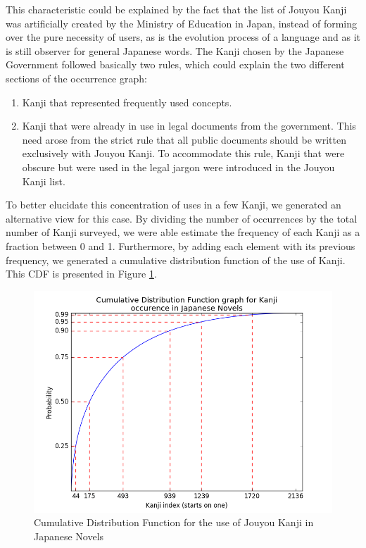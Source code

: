 This characteristic could be explained by the fact that the list of Jouyou Kanji was artificially created by the Ministry of Education in Japan, instead of forming over the pure necessity of users, as is the evolution process of a language and as it is still observer for general Japanese words. The Kanji chosen by the Japanese Government followed basically two rules, which could explain the two different sections of the occurrence graph:

\begin{enumerate}
    \item Kanji that represented frequently used concepts.
    \item Kanji that were already in use in legal documents from the government. This need arose from the strict rule that all public documents should be written exclusively with Jouyou Kanji. To accommodate this rule, Kanji that were obscure but were used in the legal jargon were introduced in the Jouyou Kanji list.
\end{enumerate}

To better elucidate this concentration of uses in a few Kanji, we generated an alternative view for this case. By dividing the number of occurrences by the total number of Kanji surveyed, we were able estimate the frequency of each Kanji as a fraction between 0 and 1. Furthermore, by adding each element with its previous frequency, we generated a cumulative distribution function of the use of Kanji. This CDF is presented in Figure \ref{fig:cdfkanji}.

\begin{figure}[hb]
    \centering
    \includegraphics[width=0.8\linewidth]{Cap2/CDFKanji}
    \caption{Cumulative Distribution Function for the use of Jouyou Kanji in Japanese Novels}
    \label{fig:cdfkanji}
\end{figure}

